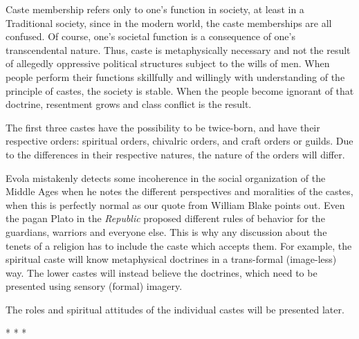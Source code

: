 Caste membership refers only to one's function in society, at least in a Traditional society, since in the modern world, the caste memberships are all confused. Of course, one's societal function is a consequence of one's transcendental nature. Thus, caste is metaphysically necessary and not the result of allegedly oppressive political structures subject to the wills of men. When people perform their functions skillfully and willingly with understanding of the principle of castes, the society is stable. When the people become ignorant of that doctrine, resentment grows and class conflict is the result.

The first three castes have the possibility to be twice-born, and have their respective orders: spiritual orders, chivalric orders, and craft orders or guilds. Due to the differences in their respective natures, the nature of the orders will differ.

Evola mistakenly detects some incoherence in the social organization of the Middle Ages when he notes the different perspectives and moralities of the castes, when this is perfectly normal as our quote from William Blake points out. Even the pagan Plato in the \emph{Republic} proposed different rules of behavior for the guardians, warriors and everyone else. This is why any discussion about the tenets of a religion has to include the caste which accepts them. For example, the spiritual caste will know metaphysical doctrines in a trans-formal (image-less) way. The lower castes will instead believe the doctrines, which need to be presented using sensory (formal) imagery.

The roles and spiritual attitudes of the individual castes will be presented later.



\begin{center}* * *\end{center}

